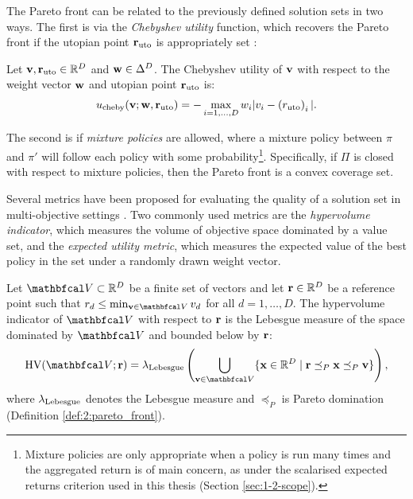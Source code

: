 The Pareto front can be related to the previously defined solution sets in two ways. The first is via the \textit{Chebyshev utility} function, which recovers the Pareto front if the utopian point $\mathbf{r}_{\textnormal{uto}}$ is appropriately set \mbox{\cite{moo_chebyshev}}:
%
\begin{defn}
    \label{def:2:chebyshev_utility}
    Let $\mathbf{v},\mathbf{r}_{\textnormal{uto}}\in\mathbb{R}^D$ and $\mathbf{w}\in\Delta^D$. The \textnormal{Chebyshev utility} of $\mathbf{v}$ with respect to the weight vector $\mathbf{w}$ and utopian point $\mathbf{r}_{\textnormal{uto}}$ is:
    \begin{align}
        {u_{\textnormal{cheby}}}(\mathbf{v};\mathbf{w},\mathbf{r}_{\textnormal{uto}}) = - \max_{i=1,\ldots,D} w_i |v_i - \left(r_{\textnormal{uto}}\right)_i|. \label{eq:2:cheby}
    \end{align}
\end{defn}

The second is if \textit{mixture policies} are allowed, where a mixture policy between $\pi$ and $\pi'$ will follow each policy with some probability\footnote{Mixture policies are only appropriate when a policy is run many times and the aggregated return is of main concern, as under the scalarised expected returns criterion used in this thesis (Section \ref{sec:1-2-scope}).}. Specifically, if $\Pi$ is closed with respect to mixture policies, then the Pareto front is a convex coverage set.

Several metrics have been proposed for evaluating the 
quality of a solution set in multi-objective settings 
\cite{morl_survey}. Two commonly used metrics are the 
\textit{hypervolume indicator}, which measures the volume 
of objective space dominated by a value set, and the 
\textit{expected utility metric}, which measures the 
expected value of the best policy in the set under a 
randomly drawn weight vector.

\begin{defn}
    \label{def:2:hypervolume}
    Let $\bfcl{V}\subset\bb{R}^D$ be a finite set of vectors 
    and let $\mathbf{r}\in\mathbb{R}^D$ be a \textnormal{reference 
    point} such that $r_d \leq \min_{\bff{v}\in\bfcl{V}} v_d$ 
    for all $d=1,\ldots,D$. The \textnormal{hypervolume 
    indicator} of $\bfcl{V}$ with respect to $\mathbf{r}$ is 
    the Lebesgue measure of the space dominated by 
    $\bfcl{V}$ and bounded below by $\mathbf{r}$:
    \begin{align}
        \HV(\bfcl{V};\bff{r}) = \lambdalebesgue\left(
            \bigcup_{\bff{v}\in\bfcl{V}} 
            \{\bff{x}\in\bb{R}^D \mid 
            \bff{r} \preceq_P \bff{x} \preceq_P \bff{v}\}
        \right),
    \end{align}
    where ${\lambda_{\textnormal{Lebesgue}}}$ denotes the Lebesgue measure and $\preceq_P$ is Pareto domination (Definition \ref{def:2:pareto_front}). 
\end{defn}


